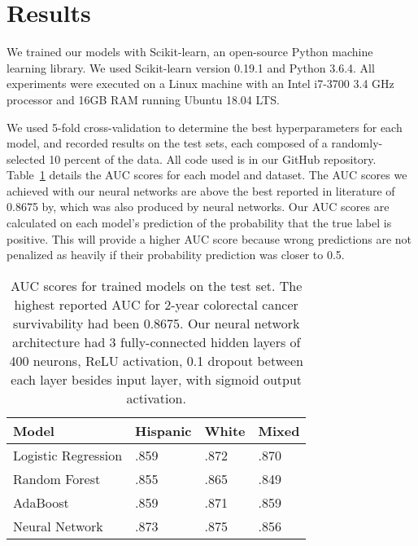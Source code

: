 \documentclass[review]{elsarticle}
\begin{document}
\section{Results}
We trained our models with Scikit-learn, an open-source Python machine learning library. We used Scikit-learn version 0.19.1 and Python 3.6.4. All experiments were executed on a Linux machine with an Intel i7-3700 3.4 GHz processor and 16GB RAM running Ubuntu 18.04 LTS.

We used 5-fold cross-validation to determine the best hyperparameters for each model, and recorded results on the test sets, each composed of a randomly-selected 10 percent of the data. All code used is in our GitHub repository\cite{cancer_survivability}. Table~\ref{auc-scores} details the AUC scores for each model and dataset. The AUC scores we achieved with our neural networks are above the best reported in literature of 0.8675 by\cite{al2017survivability}, which was also produced by neural networks. Our AUC scores are calculated on each model's prediction of the probability that the true label is positive. This will provide a higher AUC score because wrong predictions are not penalized as heavily if their probability prediction was closer to 0.5.
\begin{table}[H]
	\centering
	\caption{AUC scores for trained models on the test set. The highest reported AUC for 2-year colorectal cancer survivability had been 0.8675\cite{al2017survivability}. Our neural network architecture had 3 fully-connected hidden layers of 400 neurons, ReLU activation, 0.1 dropout between each layer besides input layer, with sigmoid output activation.}
	\begin{tabular}{llll}
		\textbf{Model}      & \textbf{Hispanic} & \textbf{White} & \textbf{Mixed}  \\ 
		\hline
		Logistic Regression & .859              & .872           & .870             \\
		Random Forest       & .855              & .865           & .849            \\
		AdaBoost            & .859              & .871           & .859            \\
		Neural Network       & .873              & .875           & .856           
	\end{tabular}
	
	\label{auc-scores}
\end{table}
\end{document}
